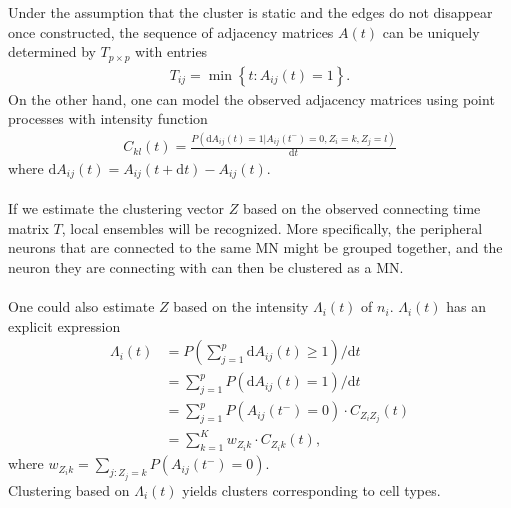 Under the assumption that the cluster is static and the edges do not disappear once constructed, the sequence of adjacency matrices $A{(t)}$ can be uniquely determined by $T_{p\times p}$ with entries
\begin{align*}
T_{ij} = \min \left\{ t:A_{ij}{(t)}=1 \right\}.
\end{align*}
On the other hand, one can model the observed adjacency matrices using point processes with intensity function
\begin{align*}
C_{kl}(t) = \frac{P\left(\text{d}A_{ij}(t)=1|A_{ij}(t^-)=0,Z_i=k,Z_j=l\right) }{\text{d}t}
\end{align*}
where $\text{d}A_{ij}(t)=A_{ij}(t+\text{d}t)-A_{ij}(t) $.
\\
\\
If we estimate the clustering vector $Z$ based on the observed connecting time matrix $T$, local ensembles will be recognized. More specifically, the peripheral neurons that are connected to the same MN might be grouped together, and the neuron they are connecting with can then be clustered as a MN.
\\
\\
One could also estimate $Z$ based on the intensity $\Lambda_i(t)$ of $n_i$. 
$\Lambda_i(t)$ has an explicit expression
\begin{align*}
\Lambda_i(t) &= P\left(\sum_{j=1}^p \text{d}A_{ij}(t)\geq 1\right)/\text{d}t\\
&= \sum_{j=1}^p P(\text{d}A_{ij}(t)=1)/\text{d}t\\
&= \sum_{j=1}^p P(A_{ij}(t^-)=0)\cdot C_{Z_iZ_j}(t)\\
&= \sum_{k=1}^K w_{Z_ik}\cdot C_{Z_ik}(t),
\end{align*}
where $w_{Z_ik}=\sum_{j:Z_j=k}P(A_{ij}(t^-)=0)$. 
\\
Clustering based on $\Lambda_i(t)$ yields clusters corresponding to cell types.
\\
\\





